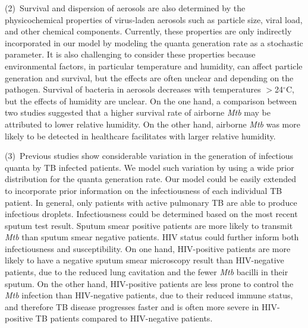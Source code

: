 \documentclass[fleqn,11pt]{wlscirep}
\begin{document}
(2)~Survival and dispersion of aerosols are also determined by the physicochemical properties of virus-laden aerosols such as particle size, viral load, and other chemical components\cite{Wang2021Science}. Currently, these properties are only indirectly incorporated in our model by modeling the quanta generation rate as a stochastic parameter. It is also challenging to consider these properties because environmental factors, in particular temperature and humidity, can affect particle generation and survival, but the effects are often unclear and depending on the pathogen\cite{Songer1967,Chan2011AdvVir,Fernstrom2013JoP,Cox1995Book,Fernstrom2013JoP,Tang2009Interface}. Survival of bacteria in aerosols decreases with temperatures $>$24$^{\circ}$C, but the effects of humidity are unclear\cite{Tang2009Interface}. On the one hand, a comparison between two studies suggested that a higher survival rate of airborne \emph{Mtb} may be attributed to lower relative humidity\cite{Loudon1969AMRRD,Lever2000LettersAppliedMicrobio}. On the other hand, airborne \emph{Mtb} was more likely to be detected in healthcare facilitates with larger relative humidity\cite{Sornboot2019IJTLD,Matuka2021IJERP}.   


(3)~Previous studies show considerable variation in the generation of infectious quanta by TB infected patients\cite{Escombe2008PLoSMed,Andrews2014JID}. We model such variation by using a wide prior distribution for the quanta generation rate. Our model could be easily extended to incorporate prior information on the infectiousness of each individual TB patient. In general, only patients with active pulmonary TB are able to produce infectious droplets\cite{Rieder1999}. Infectiousness could be determined based on the most recent sputum test result. Sputum smear positive patients are more likely to transmit \emph{Mtb} than sputum smear negative patients\cite{Shaw1954ART,Brindle1993AMRRD,Grzybowski1975BIUT}. HIV status could further inform both infectiousness and susceptibility. On one hand, HIV-positive patients are more likely to have a negative sputum smear microscopy result than HIV-negative patients, due to the reduced lung cavitation and the fewer \emph{Mtb} bacilli in their sputum\cite{Brindle1993AMRRD,Telzak1997CID}. On the other hand, HIV-positive patients are less prone to control the \emph{Mtb} infection than HIV-negative patients, due to their reduced immune status\cite{Forte1992AIDS,Kwan2011CMR,Shen1988CEI}, and therefore TB disease progresses faster and is often more severe in HIV-positive TB patients compared to HIV-negative patients. 
\end{document}
